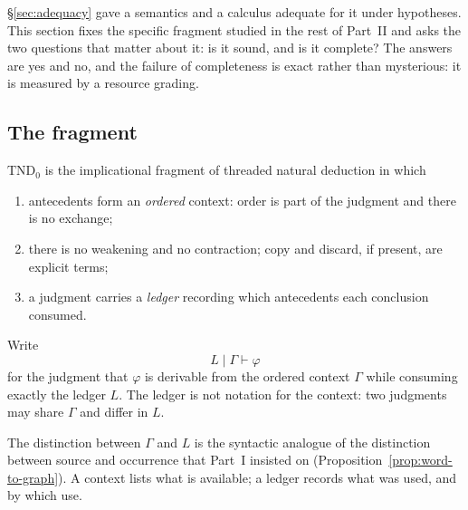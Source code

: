 \label{sec:ordered-linear-body}

\S\ref{sec:adequacy} gave a semantics and a calculus adequate for it under hypotheses.
This section fixes the specific fragment studied in the rest of Part~II and asks the two
questions that matter about it: is it sound, and is it complete?  The answers are yes and
no, and the failure of completeness is exact rather than mysterious: it is measured by a
resource grading.

\subsection{The fragment}

\begin{definition}
\label{def:tnd0}
$\mathrm{TND}_0$ is the implicational fragment of threaded natural deduction in which
\begin{enumerate}
\item antecedents form an \emph{ordered} context: order is part of the judgment and there
  is no exchange;
\item there is no weakening and no contraction; copy and discard, if present, are
  explicit terms;
\item a judgment carries a \emph{ledger} recording which antecedents each conclusion
  consumed.
\end{enumerate}
\end{definition}

\begin{definition}\label{def:ledger-judgment}
Write
\[
  L\mid \Gamma \vdash \varphi
\]
for the judgment that $\varphi$ is derivable from the ordered context $\Gamma$ while
consuming exactly the ledger $L$.  The ledger is not notation for the context: two
judgments may share $\Gamma$ and differ in $L$.
\end{definition}

The distinction between $\Gamma$ and $L$ is the syntactic analogue of the distinction
between source and occurrence that Part~I insisted on
(Proposition~\ref{prop:word-to-graph}).  A context lists what is available; a ledger
records what was used, and by which use.


